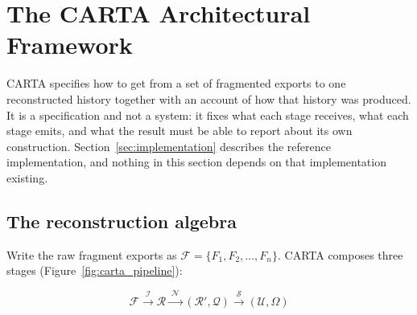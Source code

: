 
\section{The CARTA Architectural Framework}
\label{sec:carta}

CARTA specifies how to get from a set of fragmented exports to one reconstructed
history together with an account of how that history was produced. It is a
specification and not a system: it fixes what each stage receives, what each
stage emits, and what the result must be able to report about its own
construction. Section~\ref{sec:implementation} describes the reference
implementation, and nothing in this section depends on that implementation
existing.

\subsection{The reconstruction algebra}
\label{sec:carta:algebra}

Write the raw fragment exports as $\mathcal{F} = \{F_1, F_2, \dots, F_n\}$. CARTA
composes three stages (Figure~\ref{fig:carta_pipeline}):

\begin{equation}
  \mathcal{F}
  \xrightarrow{\;\mathcal{I}\;} \mathcal{R}
  \xrightarrow{\;\mathcal{N}\;} (\mathcal{R}', \mathcal{Q})
  \xrightarrow{\;\mathcal{S}\;} (\mathcal{U}, \Omega)
  \label{eq:algebra}
\end{equation}

